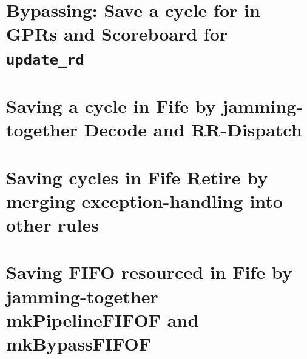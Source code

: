 \section{Bypassing: Save a cycle for in GPRs and Scoreboard for {\tt update\_rd}}


\section{Saving a cycle in Fife by jamming-together Decode and RR-Dispatch}


\section{Saving cycles in Fife Retire by merging exception-handling into other rules}


\section{Saving FIFO resourced in Fife by jamming-together mkPipelineFIFOF and mkBypassFIFOF}

